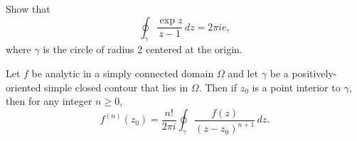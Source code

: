 \begin{example}
    Show that
    \[
        \oint_{\gamma} \frac{\exp z}{z - 1} \, dz = 2\pi i e,
    \]
    where \(\gamma\) is the circle of radius \(2\) centered at the origin.
\end{example}

\begin{theorem}
    Let \(f\) be analytic in a simply connected domain \(\Omega\) and let
    \(\gamma\) be a positively-oriented simple closed contour that lies in
    \(\Omega\). Then if \(z_0\) is a point interior to \(\gamma\), then for any
    integer \(n \geq 0\),
    \[
        f^{(n)}(z_0) = \frac{n!}{2\pi i} \oint_\gamma \frac{f(z)}{(z - z_0)^{n+1}} \, dz.
    \]
    \label{thm:cauchys-integral-formula-nth-derivative}
\end{theorem}